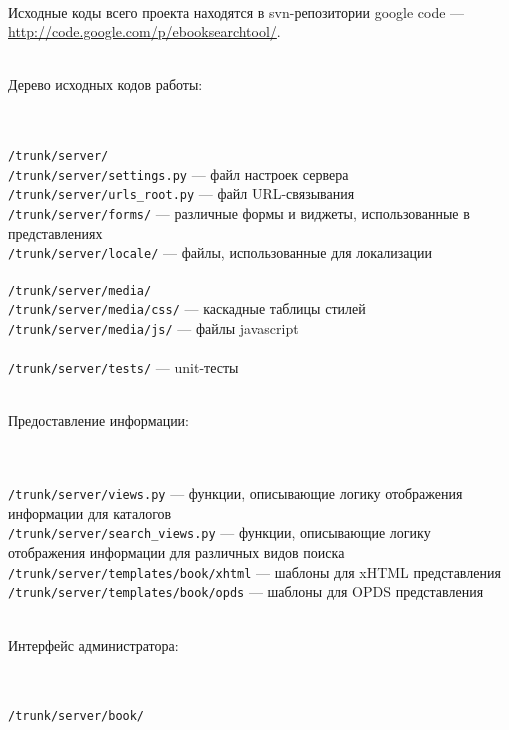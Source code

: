 \documentclass[a4paper]{article}
\begin{document}
{\small
\ 
\\
Исходные коды всего проекта находятся в svn-репозитории google code ---\\ 
\url{http://code.google.com/p/ebooksearchtool/}.
\\
\\
\begin{normalsize}Дерево исходных кодов работы:\end{normalsize}
\\
\\
{\tt /trunk/server/} \\
{\tt /trunk/server/settings.py} --- файл настроек сервера \\
{\tt /trunk/server/urls\_root.py} --- файл URL-связывания \\
{\tt /trunk/server/forms/} --- различные формы и виджеты, использованные в представлениях\\
{\tt /trunk/server/locale/} --- файлы, использованные для локализации\\
\\
{\tt /trunk/server/media/} \\
{\tt /trunk/server/media/css/} --- каскадные таблицы стилей\\
{\tt /trunk/server/media/js/} --- файлы javascript\\
\\
{\tt /trunk/server/tests/} --- unit-тесты \\
\\
\begin{normalsize}Предоставление информации:\end{normalsize}
\\
\\
{\tt /trunk/server/views.py} --- функции, описывающие логику отображения информации для каталогов\\
{\tt /trunk/server/search\_views.py} --- функции, описывающие логику отображения информации для различных видов поиска\\
{\tt /trunk/server/templates/book/xhtml} --- шаблоны для xHTML представления\\
{\tt /trunk/server/templates/book/opds} --- шаблоны для OPDS представления
\\
\\
\begin{normalsize}Интерфейс администратора:\end{normalsize}
\\
\\
{\tt /trunk/server/book/} \\
}
\end{document}
